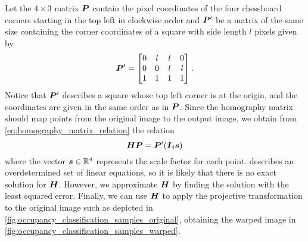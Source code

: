 \documentclass[../main.tex]{subfiles}
\begin{document}
Let the $4 \times 3$ matrix ${\bm{P}}$ contain the pixel coordinates of the four chessboard corners starting in the top left in clockwise order and ${\bm{P}}'$ be a matrix of the same size containing the corner coordinates of a square with side length $l$ pixels given by
\begin{equation*}
    {\bm{P}}' = \begin{bmatrix}
        0 & l & l & 0 \\
        0 & 0 & l & l \\
        1 & 1 & 1 & 1
    \end{bmatrix}.
\end{equation*}
Notice that ${\bm{P}}'$ describes a square whose top left corner is at the origin, and the coordinates are given in the same order as in ${\bm{P}}$.
Since the homography matrix should map points from the original image to the output image, we obtain from \cref{eq:homography_matrix_relation} the relation 
\begin{equation}
    \label{eq:homography_matrix_relation_corners}
    {\bm{H}} {\bm{P}} = {\bm{P}}' ({\bm{I}}_4 {\bm{s}})
\end{equation}
where the vector ${\bm{s}} \in \mathbb{R}^4$ represents the scale factor for each point.
 describes an overdetermined set of linear equations, so it is likely that there is no exact solution for ${\bm{H}}$. 
However, we approximate ${\bm{H}}$ by finding the solution with the least squared error.
Finally, we can use ${\bm{H}}$ to apply the projective transformation to the original image such as depicted in \cref{fig:occupancy_classification_samples_original}, obtaining the warped image in \cref{fig:occupancy_classification_samples_warped}.
\end{document}
